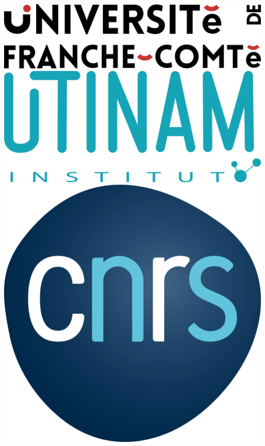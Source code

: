 \documentclass[english]{article}
\begin{document}
\begin{titlepage}

\begin{center}
        \includegraphics[scale=0.05]{rsc/logos/LOGO-UNIV-FC_COULEUR.png}
        \hspace{1cm}
        \includegraphics[scale=0.025]{rsc/logos/utinam.png}
        \hspace{1cm}
        \includegraphics[scale=0.04]{rsc/logos/CNRS.png}

\end{center}
\end{titlepage}
\end{document}
